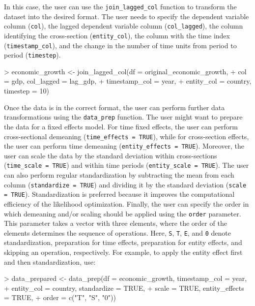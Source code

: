 \documentclass[a4paper]{article}
\begin{document}
In this case, the user can use the \verb+join_lagged_col+ function to transform the dataset into the desired format. The user needs to specify the dependent variable column (\verb+col+), the lagged dependent variable column (\verb+col_lagged+), the column identifying the cross-section (\verb+entity_col+), the column with the time index (\verb+timestamp_col+), and the change in the number of time units from period to period (\verb+timestep+).

\begin{Schunk}
\begin{Sinput}
> economic_growth <- join_lagged_col(df = original_economic_growth,
+                         col = gdp, col_lagged = lag_gdp,
+                         timestamp_col = year,
+                         entity_col = country, timestep = 10)
\end{Sinput}
\end{Schunk}

Once the data is in the correct format, the user can perform further data transformations using the \verb+data_prep+ function. The user might want to prepare the data for a fixed effects model. For time fixed effects, the user can perform cross-sectional demeaning (\verb+time_effects = TRUE+), while for cross-section effects, the user can perform time demeaning (\verb+entity_effects = TRUE+). Moreover, the user can scale the data by the standard deviation within cross-sections (\verb+time_scale = TRUE+) and within time periods (\verb+entity_scale = TRUE+). The user can also perform regular standardization by subtracting the mean from each column (\verb+standardize = TRUE+) and dividing it by the standard deviation (\verb+scale = TRUE+). Standardization is preferred because it improves the computational efficiency of the likelihood optimization. Finally, the user can specify the order in which demeaning and/or scaling should be applied using the \verb+order+ parameter. This parameter takes a vector with three elements, where the order of the elements determines the sequence of operations. Here, \texttt{S}, \texttt{T}, \texttt{E}, and \texttt{0} denote standardization, preparation for time effects, preparation for entity effects, and skipping an operation, respectively. For example, to apply the entity effect first and then standardization, use:
\begin{Schunk}
\begin{Sinput}
> data_prepared <- data_prep(df = economic_growth, timestamp_col = year,
+                            entity_col = country, standardize = TRUE,
+                            scale = TRUE, entity_effects = TRUE,
+                            order = c("T", "S", "0"))
\end{Sinput}
\end{Schunk}
\end{document}
